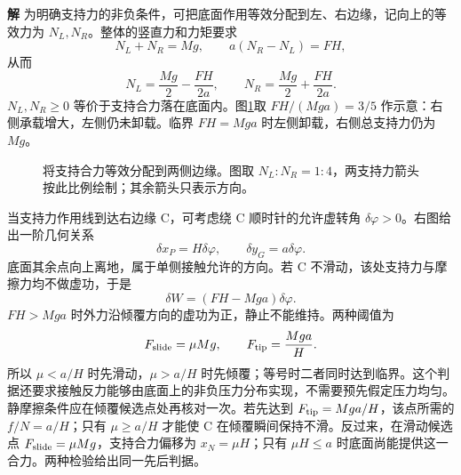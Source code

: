 \documentclass[11pt,openany,fontset=fandol]{ctexbook}
\theoremstyle{definition}\newtheorem{example}{例}[chapter]\newtheorem{exercise}{习题}[chapter]
\newcommand{\SolutionStart}{\par\medskip\ifdim\pagetotal>0pt\ifdim\dimexpr\pagegoal-\pagetotal\relax<3\baselineskip\newpage\fi\fi\noindent\textbf{解}\quad\ignorespaces}
\newenvironment{solution}{\SolutionStart}{\par\medskip}
\begin{document}
\begin{solution}
为明确支持力的非负条件，可把底面作用等效分配到左、右边缘，记向上的等效力为 $N_L,N_R$。整体的竖直力和力矩要求
\[
N_L+N_R=Mg,\qquad a(N_R-N_L)=FH,
\]
从而
\[
N_L=\frac{Mg}{2}-\frac{FH}{2a},\qquad
N_R=\frac{Mg}{2}+\frac{FH}{2a}.
\]
$N_L,N_R\ge0$ 等价于支持合力落在底面内。图\ref{mp5:fig:l5-e6-edge}取 $FH/(Mga)=3/5$ 作示意：右侧承载增大，左侧仍未卸载。临界 $FH=Mga$ 时左侧卸载，右侧总支持力仍为 $Mg$。
\begin{figure}[H]\centering
{}
\caption{将支持合力等效分配到两侧边缘。图取 $N_L:N_R=1:4$，两支持力箭头按此比例绘制；其余箭头只表示方向。}\label{mp5:fig:l5-e6-edge}
\end{figure}

当支持力作用线到达右边缘 C，可考虑绕 C 顺时针的允许虚转角 $\delta\varphi>0$。右图给出一阶几何关系
\[
\delta x_P=H\delta\varphi,\qquad
\delta y_G=a\delta\varphi.
\]
底面其余点向上离地，属于单侧接触允许的方向。若 C 不滑动，该处支持力与摩擦力均不做虚功，于是
\[
\delta W=(FH-Mga)\delta\varphi.
\]
$FH>Mga$ 时外力沿倾覆方向的虚功为正，静止不能维持。两种阈值为
\[
F_{\rm slide}=\mu Mg,\qquad F_{\rm tip}=\frac{Mga}{H}.
\]
所以 $\mu<a/H$ 时先滑动，$\mu>a/H$ 时先倾覆；等号时二者同时达到临界。这个判据还要求接触反力能够由底面上的非负压力分布实现，不需要预先假定压力均匀。
静摩擦条件应在倾覆候选点处再核对一次。若先达到 $F_{\rm tip}=Mga/H$，该点所需的 $f/N=a/H$；只有 $\mu\ge a/H$ 才能使 C 在倾覆瞬间保持不滑。反过来，在滑动候选点 $F_{\rm slide}=\mu Mg$，支持合力偏移为 $x_N=\mu H$；只有 $\mu H\le a$ 时底面尚能提供这一合力。两种检验给出同一先后判据。

\end{solution}
\end{document}
